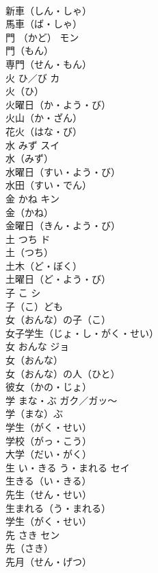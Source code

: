 \documentclass[8pt]{extreport}
\begin{document}
\begin{CJK}{UTF8}{min}
\\	新車（しん・しゃ）　
\\	馬車（ば・しゃ）　
\\	門	（かど）	モン	
\\	門（もん）　
\\	専門（せん・もん）　
\\	火	ひ／び	カ	
\\	火（ひ）　
\\	火曜日（か・よう・び）　
\\	火山（か・ざん）　
\\	花火（はな・び）　
\\	水	みず	スイ	
\\	水（みず）　
\\	水曜日（すい・よう・び）　
\\	水田（すい・でん）　
\\	金	かね	キン	
\\	金（かね）　
\\	金曜日（きん・よう・び）　
\\	土	つち	ド	
\\	土（つち）　
\\	土木（ど・ぼく）　
\\	土曜日（ど・よう・び）　
\\	子	こ	シ	
\\	子（こ）ども　
\\	女（おんな）の子（こ）　
\\	女子学生（じょ・し・がく・せい）　
\\	女	おんな	ジョ	
\\	女（おんな）　
\\	女（おんな）の人（ひと）　
\\	彼女（かの・じょ）　
\\	学	まな・ぶ	ガク／ガッ～	
\\	学（まな）ぶ　
\\	学生（がく・せい）　
\\	学校（がっ・こう）　
\\	大学（だい・がく）　
\\	生	い・きる う・まれる	セイ	
\\	生きる（い・きる）　
\\	先生（せん・せい）　
\\	生まれる（う・まれる）　
\\	学生（がく・せい）　
\\	先	さき	セン	
\\	先（さき）　
\\	先月（せん・げつ）　

\end{CJK}
\end{document}
